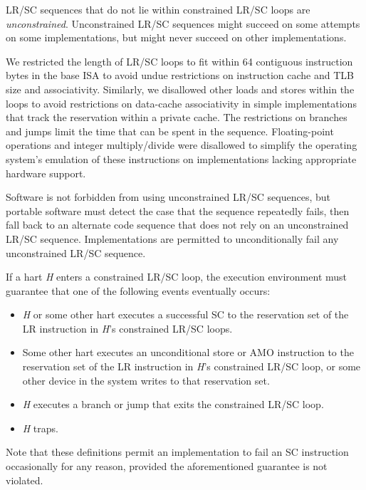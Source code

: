 LR/SC sequences that do not lie within constrained LR/SC loops are {\em
unconstrained}.  Unconstrained LR/SC sequences might succeed on some attempts
on some implementations, but might never succeed on other implementations.

\begin{commentary}
We restricted the length of LR/SC loops to fit within 64 contiguous
instruction bytes in the base ISA to avoid undue restrictions on instruction
cache and TLB size and associativity.
Similarly, we disallowed other loads and stores within the loops to avoid
restrictions on data-cache associativity in simple implementations that track
the reservation within a private cache.
The restrictions on branches and jumps limit the time that
can be spent in the sequence.  Floating-point operations and integer
multiply/divide were disallowed to simplify the operating system's emulation
of these instructions on implementations lacking appropriate hardware support.

Software is not forbidden from using unconstrained LR/SC sequences, but
portable software must detect the case that the sequence repeatedly fails,
then fall back to an alternate code sequence that does not rely on an
unconstrained LR/SC sequence.  Implementations are permitted to
unconditionally fail any unconstrained LR/SC sequence.
\end{commentary}

If a hart {\em H} enters a constrained LR/SC loop, the execution environment
must guarantee that one of the following events eventually occurs:
\vspace{-0.2in}
\begin{itemize}
\parskip 0pt
\itemsep 1pt
\item {\em H} or some other hart executes a successful SC to the reservation
  set of the LR instruction in {\em H}'s constrained LR/SC loops.
\item Some other hart executes an unconditional store or AMO instruction to
  the reservation set of the LR instruction in {\em H}'s constrained LR/SC
  loop, or some other device in the system writes to that reservation set.
\item {\em H} executes a branch or jump that exits the constrained LR/SC loop.
\item {\em H} traps.
\end{itemize}

\begin{commentary}
Note that these definitions permit an implementation to fail an SC instruction
occasionally for any reason, provided the aforementioned guarantee is not
violated.
\end{commentary}

